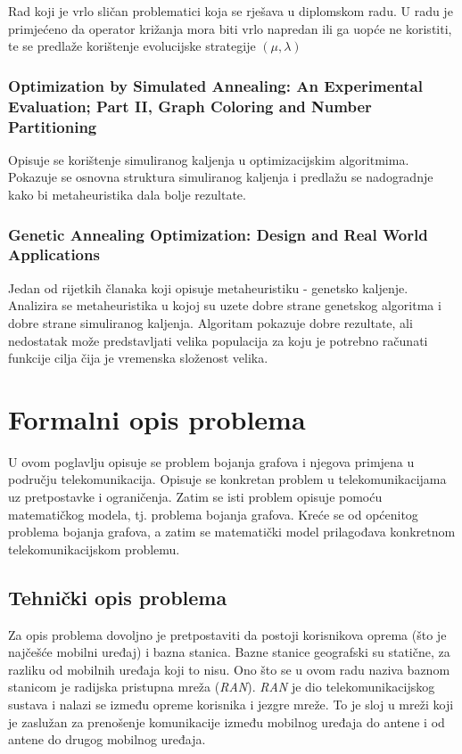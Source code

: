 \documentclass[times, utf8, diplomski, numeric]{fer}
\begin{document}
Rad koji je vrlo sličan problematici koja se rješava u diplomskom radu. U radu je primjećeno da operator križanja mora biti vrlo napredan ili ga uopće ne koristiti, te se predlaže korištenje evolucijske strategije $(\mu, \lambda)$ 

\subsection*{Optimization by Simulated Annealing: An Experimental Evaluation; Part II, Graph Coloring and Number Partitioning \cite{lit13}}

Opisuje se korištenje simuliranog kaljenja u optimizacijskim algoritmima. Pokazuje se osnovna struktura simuliranog kaljenja i predlažu se nadogradnje kako bi metaheuristika dala bolje rezultate.

\subsection*{Genetic Annealing Optimization: Design and Real World Applications \cite{lit18}}

Jedan od rijetkih članaka koji opisuje metaheuristiku - genetsko kaljenje. Analizira se metaheuristika u kojoj su uzete dobre strane genetskog algoritma i dobre strane simuliranog kaljenja. Algoritam pokazuje dobre rezultate, ali nedostatak može predstavljati velika populacija za koju je potrebno računati funkcije cilja čija je vremenska složenost velika.


\chapter{Formalni opis problema}

U ovom poglavlju opisuje se problem bojanja grafova i njegova primjena u području telekomunikacija. Opisuje se konkretan problem u telekomunikacijama uz pretpostavke i ograničenja. Zatim se isti problem opisuje pomoću matematičkog modela, tj. problema bojanja grafova. Kreće se od općenitog problema bojanja grafova, a zatim se matematički model prilagođava konkretnom telekomunikacijskom problemu.

\section{Tehnički opis problema}

Za opis problema dovoljno je pretpostaviti da postoji korisnikova oprema (što je najčešće mobilni uređaj) i bazna stanica. Bazne stanice geografski su statične, za razliku od mobilnih uređaja koji to nisu.
Ono što se u ovom radu naziva baznom stanicom je radijska pristupna mreža  (\emph{RAN}). \emph{RAN} je dio telekomunikacijskog sustava i nalazi se između opreme korisnika i jezgre mreže. To je sloj u mreži koji je zaslužan za prenošenje komunikacije između mobilnog uređaja do antene i od antene do drugog mobilnog uređaja. 
\end{document}
